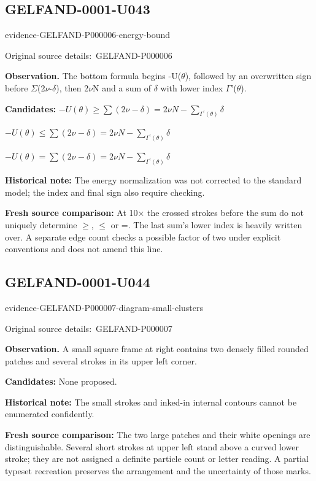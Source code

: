 \documentclass[11pt]{article}
\newcommand{\EvidenceBlock}[4]{%
 \par\smallskip\noindent\begin{minipage}{\linewidth}
 \begin{minipage}[t]{.47\linewidth}\vspace{0pt}\centering
 \csname evidence-#1-#2\endcsname\par
 {\scriptsize\SourceCropCaption\ #1}\par
 \end{minipage}\hfill
 \begin{minipage}[t]{.49\linewidth}\vspace{0pt}\raggedright
 {\small\color{orange!65!black}\textbf{#4} #3}\par
 \end{minipage}
 \end{minipage}\par\smallskip}
\newcommand{\SourceCropCaption}{Original source details:}\newcommand{\ReadingCaption}{Uncertain reading.}\newcommand{\IncompleteCaption}{Undeciphered passage.}\newcommand{\DiagramCaption}{Diagram and typed description.}
\begin{document}
\subsection*{GELFAND-0001-U043}
\EvidenceBlock{GELFAND-P000006}{energy-bound}{The bottom formula begins -U(\(\theta\)), followed by an overwritten sign before \(\Sigma\)(2\(\nu\)-\(\delta\)), then 2\(\nu\)N and a sum of \(\delta\) with lower index \(\Gamma\)'(\(\theta\)).}{Observation.}
\par\smallskip\noindent\textbf{Candidates: } \(-U(\theta)\ge\sum(2\nu-\delta)=2\nu N-\sum_{\Gamma^{\prime}(\theta)}\delta\)\par\smallskip\(-U(\theta)\le\sum(2\nu-\delta)=2\nu N-\sum_{\Gamma^{\prime}(\theta)}\delta\)\par\smallskip\(-U(\theta)=\sum(2\nu-\delta)=2\nu N-\sum_{\Gamma^{\prime}(\theta)}\delta\)\par
\par\smallskip\noindent\textbf{Historical note: } The energy normalization was not corrected to the standard model; the index and final sign also require checking.\par
\par\smallskip\noindent\textbf{Fresh source comparison: } At 10× the crossed strokes before the sum do not uniquely determine \(\ge\), \(\le\) or =. The last sum’s lower index is heavily written over. A separate edge count checks a possible factor of two under explicit conventions and does not amend this line.\par

\subsection*{GELFAND-0001-U044}
\EvidenceBlock{GELFAND-P000007}{diagram-small-clusters}{A small square frame at right contains two densely filled rounded patches and several strokes in its upper left corner.}{Observation.}
\par\smallskip\noindent\textbf{Candidates: } None proposed.\par
\par\smallskip\noindent\textbf{Historical note: } The small strokes and inked-in internal contours cannot be enumerated confidently.\par
\par\smallskip\noindent\textbf{Fresh source comparison: } The two large patches and their white openings are distinguishable. Several short strokes at upper left stand above a curved lower stroke; they are not assigned a definite particle count or letter reading. A partial typeset recreation preserves the arrangement and the uncertainty of those marks.\par
\end{document}
